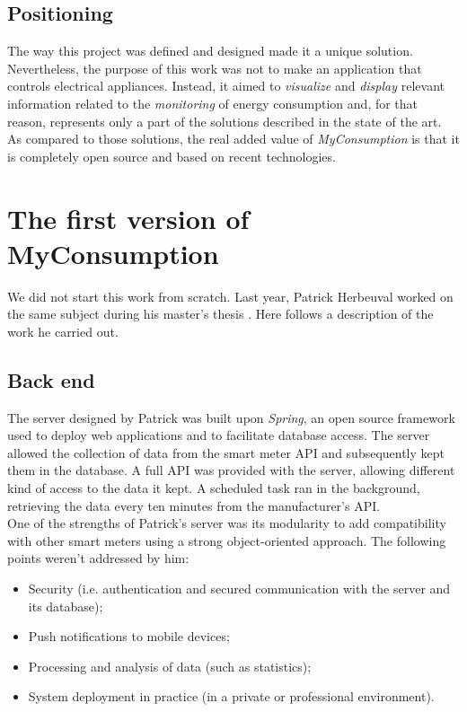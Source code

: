 \documentclass[a4paper, oneside, 11pt]{book}
\begin{document}
\subsection{Positioning}
The way this project was defined and designed made it a unique solution. Nevertheless, the purpose of this work was not to make an application that controls electrical appliances. Instead, it aimed to \emph{visualize} and \emph{display} relevant information related to the \emph{monitoring} of energy consumption and, for that reason, represents only a part of the solutions described in the state of the art. As compared to those solutions, the real added value of \textit{MyConsumption} is that it is completely open source and based on recent technologies.

\section{The first version of MyConsumption}
We did not start this work from scratch. Last year, Patrick Herbeuval worked on the same subject during his master’s thesis \cite{patrick:thesis}. Here follows a description of the work he carried out.

\subsection{Back end}
The server designed by Patrick was built upon \textit{Spring}, an open source framework used to deploy web applications and to facilitate database access. The server allowed the collection of data from the smart meter API and subsequently kept them in the database. A full API was provided with the server, allowing different kind of access to the data it kept. A scheduled task ran in the background, retrieving the data every ten minutes from the manufacturer’s API.\\

One of the strengths of Patrick’s server was its modularity to add compatibility with other smart meters using a strong object-oriented approach. The following points weren’t addressed by him:
\begin{itemize}
	\item Security (i.e. authentication and secured communication with the server and its database);
	\item Push notifications to mobile devices;
	\item Processing and analysis of data (such as statistics);
	\item System deployment in practice (in a private or professional environment).
\end{itemize}
\end{document}

